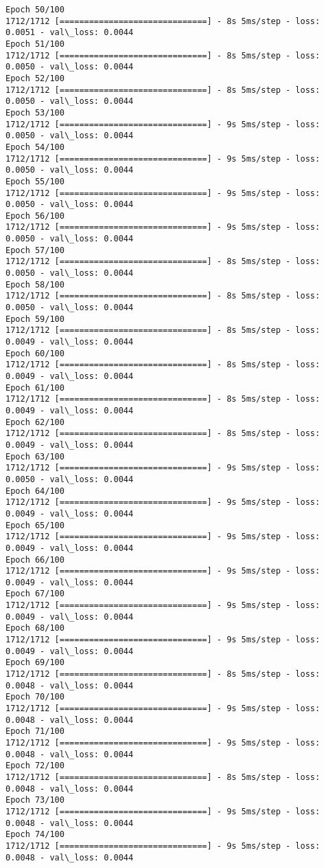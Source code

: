 \documentclass[11pt]{article}
\begin{document}
\begin{Verbatim}[commandchars=\\\{\}]
Epoch 50/100
1712/1712 [==============================] - 8s 5ms/step - loss: 0.0051 - val\_loss: 0.0044
Epoch 51/100
1712/1712 [==============================] - 8s 5ms/step - loss: 0.0050 - val\_loss: 0.0044
Epoch 52/100
1712/1712 [==============================] - 8s 5ms/step - loss: 0.0050 - val\_loss: 0.0044
Epoch 53/100
1712/1712 [==============================] - 9s 5ms/step - loss: 0.0050 - val\_loss: 0.0044
Epoch 54/100
1712/1712 [==============================] - 9s 5ms/step - loss: 0.0050 - val\_loss: 0.0044
Epoch 55/100
1712/1712 [==============================] - 9s 5ms/step - loss: 0.0050 - val\_loss: 0.0044
Epoch 56/100
1712/1712 [==============================] - 9s 5ms/step - loss: 0.0050 - val\_loss: 0.0044
Epoch 57/100
1712/1712 [==============================] - 8s 5ms/step - loss: 0.0050 - val\_loss: 0.0044
Epoch 58/100
1712/1712 [==============================] - 8s 5ms/step - loss: 0.0050 - val\_loss: 0.0044
Epoch 59/100
1712/1712 [==============================] - 8s 5ms/step - loss: 0.0049 - val\_loss: 0.0044
Epoch 60/100
1712/1712 [==============================] - 8s 5ms/step - loss: 0.0049 - val\_loss: 0.0044
Epoch 61/100
1712/1712 [==============================] - 8s 5ms/step - loss: 0.0049 - val\_loss: 0.0044
Epoch 62/100
1712/1712 [==============================] - 8s 5ms/step - loss: 0.0049 - val\_loss: 0.0044
Epoch 63/100
1712/1712 [==============================] - 9s 5ms/step - loss: 0.0050 - val\_loss: 0.0044
Epoch 64/100
1712/1712 [==============================] - 9s 5ms/step - loss: 0.0049 - val\_loss: 0.0044
Epoch 65/100
1712/1712 [==============================] - 9s 5ms/step - loss: 0.0049 - val\_loss: 0.0044
Epoch 66/100
1712/1712 [==============================] - 9s 5ms/step - loss: 0.0049 - val\_loss: 0.0044
Epoch 67/100
1712/1712 [==============================] - 9s 5ms/step - loss: 0.0049 - val\_loss: 0.0044
Epoch 68/100
1712/1712 [==============================] - 9s 5ms/step - loss: 0.0049 - val\_loss: 0.0044
Epoch 69/100
1712/1712 [==============================] - 8s 5ms/step - loss: 0.0048 - val\_loss: 0.0044
Epoch 70/100
1712/1712 [==============================] - 9s 5ms/step - loss: 0.0048 - val\_loss: 0.0044
Epoch 71/100
1712/1712 [==============================] - 9s 5ms/step - loss: 0.0048 - val\_loss: 0.0044
Epoch 72/100
1712/1712 [==============================] - 8s 5ms/step - loss: 0.0048 - val\_loss: 0.0044
Epoch 73/100
1712/1712 [==============================] - 9s 5ms/step - loss: 0.0048 - val\_loss: 0.0044
Epoch 74/100
1712/1712 [==============================] - 9s 5ms/step - loss: 0.0048 - val\_loss: 0.0044

\end{Verbatim}
\end{document}
